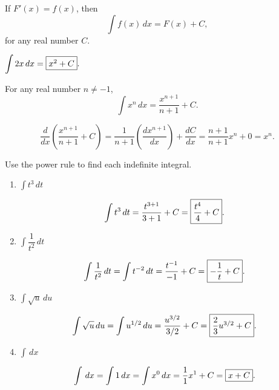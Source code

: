\documentclass{book}
\newcommand{\dx}{\,dx}
\newcommand{\du}{\,du}
\newcommand{\dt}{\,dt}
\newcommand{\dint}{\displaystyle \int}
\begin{document}
\begin{Cor} If $F'(x) = f(x)$, then \[\int f(x)\,dx = F(x) + C,\] for any real number $C$.\end{Cor}\vs

\begin{Exam} $\dint 2x\dx = \fbox{$x^2 + C$}.$
\end{Exam}\vs


\begin{Prop} For any real number $n\neq -1$, \[\int x^n\,dx = \dfrac{x^{n+1}}{n+1} + C.\]\end{Prop}

\begin{pf} \[\dfrac{d}{dx}\left(\dfrac{x^{n+1}}{n+1} + C\right) = \dfrac{1}{n+1}\left(\dfrac{dx^{n+1}}{dx}\right) + \dfrac{dC}{dx} = \dfrac{n+1}{n+1} x^n + 0 = x^n. \]
\end{pf}\vs

\begin{Exam}Use the power rule to find each indefinite integral.
\begin{enumerate}
\item $\dint t^3\dt$

\[\int t^3\dt = \dfrac{t^{3+1}}{3+1} +C = \fbox{$\dfrac{t^4}{4}  +C$}.\]

\item $\dint \dfrac{1}{t^2}\dt$

\[ \int \dfrac{1}{t^2}\dt = \int t^{-2}\dt = \dfrac{t^{-1}}{-1} + C= \fbox{$-\dfrac{1}{t} + C$}.\]

\item $\dint \sqrt{u}\du$

\[\int \sqrt{u}\du = \int u^{1/2}\du = \dfrac{u^{3/2}}{3/2} + C = \fbox{$\dfrac{2}{3}u^{3/2} + C$}.\]

\item $\dint \dx$

\[\int \dx = \int 1\dx = \int x^0\dx = \dfrac{1}{1}x^1 + C = \fbox{$x + C$}. \]
\end{enumerate}
\end{Exam}\vs
\end{document}

